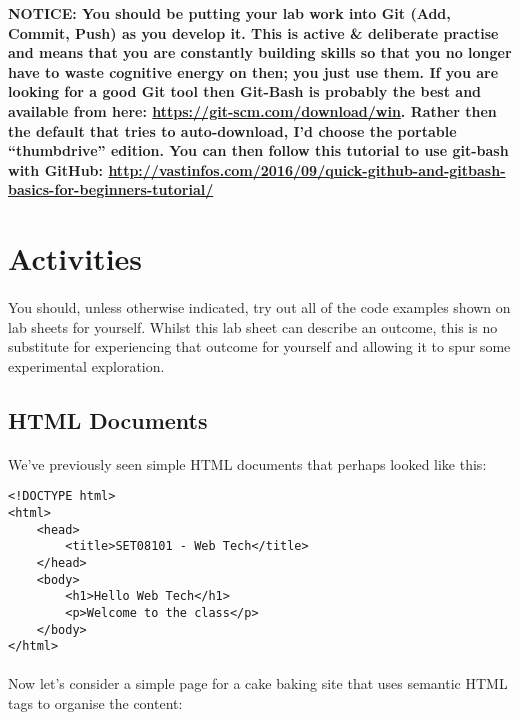 \documentclass[10pt, a4paper]{article}
\begin{document}
\begin{framed}
{\bf{NOTICE:} You should be putting your lab work into Git (Add, Commit, Push) as you develop it. This is active \& deliberate practise and means that you are constantly building skills so that you no longer have to waste cognitive energy on then; you just use them. If you are looking for a good Git tool then Git-Bash is probably the best and available from here: \url{https://git-scm.com/download/win}. Rather then the default that tries to auto-download, I'd choose the portable ``thumbdrive'' edition. You can then follow this tutorial to use git-bash with GitHub: \url{http://vastinfos.com/2016/09/quick-github-and-gitbash-basics-for-beginners-tutorial/} }
\end{framed}


\section{Activities}

\paragraph{} You should, unless otherwise indicated, try out all of the code examples shown on lab sheets for yourself. Whilst this lab sheet can describe an outcome, this is no substitute for experiencing that outcome for yourself and allowing it to spur some experimental exploration.

\subsection{HTML Documents}
\paragraph{} We've previously seen simple HTML documents that perhaps looked like this:

\begin{lstlisting}
<!DOCTYPE html>
<html>
    <head>
        <title>SET08101 - Web Tech</title>
    </head>
    <body>
        <h1>Hello Web Tech</h1>
        <p>Welcome to the class</p>
    </body>
</html>
\end{lstlisting}

\paragraph{} Now let's consider a simple page for a cake baking site that uses semantic HTML tags to organise the content:
\end{document}
